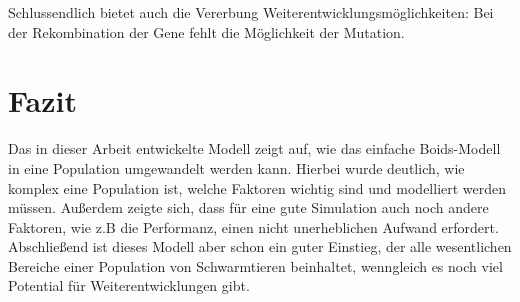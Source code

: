 \documentclass[draft=false
              ,paper=a4
              ,twoside=false
              ,fontsize=11pt
              ,headsepline
              ,BCOR10mm
              ,DIV11
              ,bibtotoc
              ,liststotoc
              ]{scrbook}
\begin{document}
Schlussendlich bietet auch die Vererbung Weiterentwicklungsmöglichkeiten: Bei der Rekombination der Gene fehlt die Möglichkeit der Mutation.

\section{Fazit}
Das in dieser Arbeit entwickelte Modell zeigt auf, wie das einfache Boids-Modell in eine Population umgewandelt werden kann. Hierbei wurde deutlich, wie komplex eine Population ist, welche Faktoren wichtig sind und modelliert werden müssen. Außerdem zeigte sich, dass für eine gute Simulation auch noch andere Faktoren, wie z.B die Performanz, einen nicht unerheblichen Aufwand erfordert.
Abschließend ist dieses Modell aber schon ein guter Einstieg, der alle wesentlichen Bereiche einer Population von Schwarmtieren beinhaltet, wenngleich es noch viel Potential für Weiterentwicklungen gibt.



\backmatter

\nocite{*}



\renewcommand{\nomname}{Glossar}
\clearpage
\markboth{\nomname}{\nomname} %
\printnomenclature

\printindex

\HAWasurency
\end{document}
